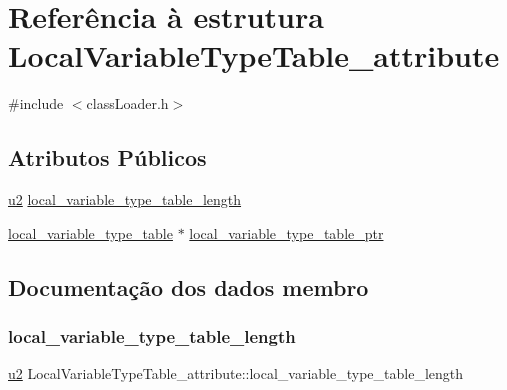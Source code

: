 \hypertarget{struct_local_variable_type_table__attribute}{}\section{Referência à estrutura Local\+Variable\+Type\+Table\+\_\+attribute}
\label{struct_local_variable_type_table__attribute}


{\ttfamily \#include $<$class\+Loader.\+h$>$}

\subsection*{Atributos Públicos}
\begin{DoxyCompactItemize}
\item 
\hyperlink{util_8h_a55ef8d87fd202b8417704c089899c5b9}{u2} \hyperlink{struct_local_variable_type_table__attribute_a8c6bded34edd9a54b97b56b080dd56d8}{local\+\_\+variable\+\_\+type\+\_\+table\+\_\+length}
\item 
\hyperlink{structlocal__variable__type__table}{local\+\_\+variable\+\_\+type\+\_\+table} $\ast$ \hyperlink{struct_local_variable_type_table__attribute_af7140cde866901debb62cdc0ebd88483}{local\+\_\+variable\+\_\+type\+\_\+table\+\_\+ptr}
\end{DoxyCompactItemize}


\subsection{Documentação dos dados membro}
\mbox{\label{struct_local_variable_type_table__attribute_a8c6bded34edd9a54b97b56b080dd56d8}} 
\subsubsection{\texorpdfstring{local\+\_\+variable\+\_\+type\+\_\+table\+\_\+length}{local\_variable\_type\_table\_length}}
{\footnotesize\ttfamily \hyperlink{util_8h_a55ef8d87fd202b8417704c089899c5b9}{u2} Local\+Variable\+Type\+Table\+\_\+attribute\+::local\+\_\+variable\+\_\+type\+\_\+table\+\_\+length}

